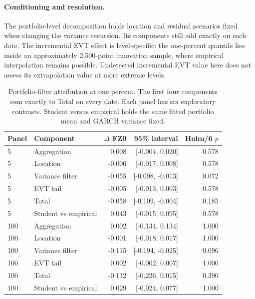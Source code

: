 \documentclass[11pt]{article}
\theoremstyle{definition}\newtheorem{definition}[theorem]{Definition}
\theoremstyle{remark}\newtheorem{remark}[theorem]{Remark}
\begin{document}
\paragraph{Conditioning and resolution.}
The portfolio-level decomposition holds location and residual scenarios fixed when changing the variance recursion. Its components still add exactly on each date. The incremental EVT effect is level-specific: the one-percent quantile lies inside an approximately 2,500-point innovation sample, where empirical interpolation remains possible. Undetected incremental EVT value here does not assess its extrapolation value at more extreme levels.
\begin{table}[htbp]
\centering\footnotesize
\setlength{\tabcolsep}{4pt}
\begin{tabular}{llrrr}
\toprule
Panel & Component & $\Delta$ FZ0 & 95\% interval & Holm/6 $p$ \\
\midrule
5 & Aggregation & 0.008 & [-0.004, 0.020] & 0.578 \\
5 & Location & -0.006 & [-0.017, 0.008] & 0.578 \\
5 & Variance filter & -0.055 & [-0.098, -0.013] & 0.072 \\
5 & EVT tail & -0.005 & [-0.013, 0.003] & 0.578 \\
5 & Total & -0.058 & [-0.109, -0.004] & 0.185 \\
5 & Student vs empirical & 0.043 & [-0.015, 0.095] & 0.578 \\
100 & Aggregation & 0.002 & [-0.134, 0.134] & 1.000 \\
100 & Location & -0.001 & [-0.018, 0.017] & 1.000 \\
100 & Variance filter & -0.115 & [-0.194, -0.025] & 0.096 \\
100 & EVT tail & 0.002 & [-0.002, 0.007] & 1.000 \\
100 & Total & -0.112 & [-0.226, 0.015] & 0.390 \\
100 & Student vs empirical & 0.029 & [-0.024, 0.077] & 1.000 \\
\bottomrule
\end{tabular}
\caption{Portfolio-filter attribution at one percent. The first four components sum exactly to Total on every date. Each panel has six exploratory contrasts. Student versus empirical holds the same fitted portfolio mean and GARCH variance fixed.}\label{tab:r4-filter}
\end{table}
\end{document}
